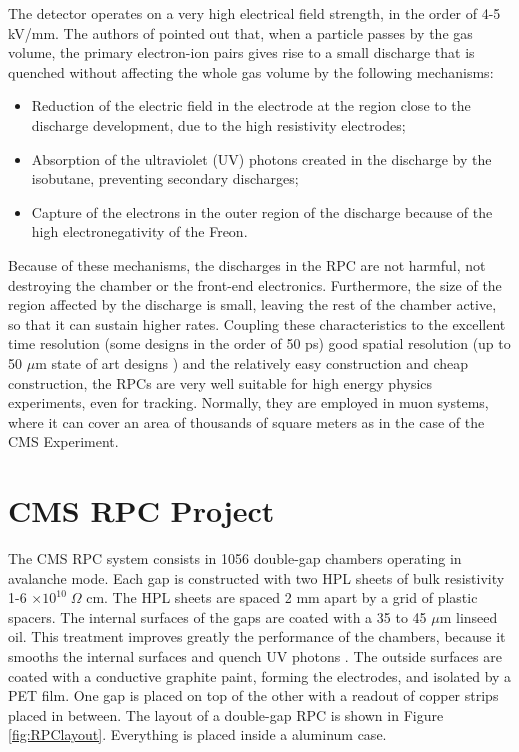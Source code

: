 The detector operates on a very high electrical field strength, in the order of 4-5 kV/mm. The authors of \cite{Santonico:1988qi} pointed out that, when a particle passes by the gas volume, the primary electron-ion pairs gives rise to a small discharge that is quenched without affecting the whole gas volume by the following mechanisms:
\begin{itemize}
    \item Reduction of the electric field in the electrode at the region close to the discharge development, due to the high resistivity electrodes;
    \item Absorption of the ultraviolet (UV) photons created in the discharge by the isobutane, preventing secondary discharges;
    \item Capture of the electrons in the outer region of the discharge because of the high electronegativity of the Freon.
\end{itemize}

Because of these mechanisms, the discharges in the RPC are not harmful, not destroying the chamber or the front-end electronics. Furthermore, the size of the region affected by the discharge is small, leaving the rest of the chamber active, so that it can sustain higher rates. Coupling these characteristics to the excellent time resolution (some designs in the order of 50 ps) good spatial resolution (up to 50 $\mu$m state of art designs \cite{Francke:2002wq}) and the relatively easy construction and cheap construction, the RPCs are very well suitable for high energy physics experiments, even for tracking. Normally, they are employed in muon systems, where it can cover an area of thousands of square meters as in the case of the CMS Experiment.

\section{CMS RPC Project}

The CMS RPC system consists in 1056 double-gap chambers operating in avalanche mode. Each gap is constructed with two HPL sheets of bulk resistivity 1-6 $\times 10^{10} \; \Omega$ cm. The HPL sheets are spaced 2 mm apart by a grid of plastic spacers. The internal surfaces of the gaps are coated with a 35 to 45 $\mu$m linseed oil. This treatment improves greatly the performance of the chambers, because it smooths the internal surfaces and quench UV photons \cite{Abbrescia:687074, Lu:2009zzd}. The outside surfaces are coated with a conductive graphite paint, forming the electrodes, and isolated by a PET film. One gap is placed on top of the other with a readout of copper strips placed in between. The layout of a double-gap RPC is shown in Figure \ref{fig:RPClayout}. Everything is placed inside a aluminum case.

